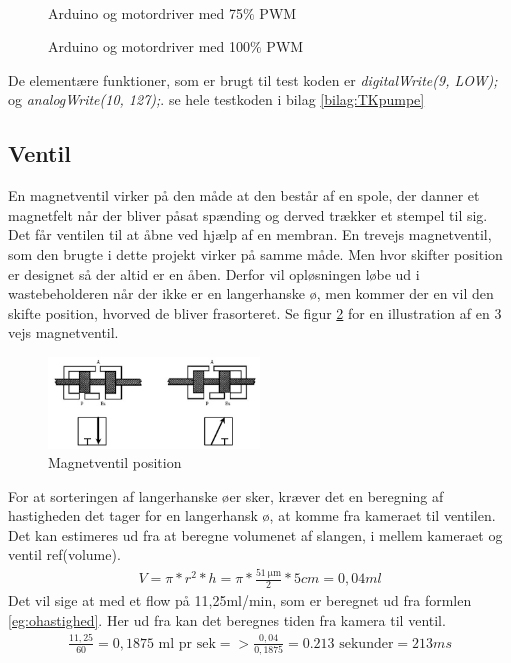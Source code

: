 \begin{figure}[htbp]
\begin{minipage}[b]{0.48\textwidth}
\end{minipage} \\ %
\begin{minipage}[t]{0.48\textwidth}
\caption{Arduino og motordriver med 75$\%$ PWM} %
\label{fig:75PWM}
\end{minipage} \hfill
\begin{minipage}[t]{0.48\textwidth}
\caption{Arduino og motordriver med 100$\%$ PWM} %
\label{fig:100PWM}
\end{minipage}
\end{figure}

De elementære funktioner, som er brugt til test koden er \textit{digitalWrite(9, LOW);} og \textit{analogWrite(10, 127);}. se hele testkoden i bilag \ref{bilag:TKpumpe}

\newpage

 \subsection{Ventil}
 En magnetventil virker på den måde at den består af en spole, der danner et magnetfelt når der bliver påsat spænding og derved trækker et stempel til sig. Det får ventilen til at åbne ved hjælp af en membran. En trevejs magnetventil, som den brugte i dette projekt virker på samme måde. Men hvor skifter position er designet så der altid er en åben. Derfor vil opløsningen løbe ud i wastebeholderen når der ikke er en langerhanske ø, men kommer der en vil den skifte position, hvorved de bliver frasorteret. Se figur \ref{fig:ventilpos} for en illustration af en 3 vejs magnetventil.

\begin{figure}[H]
	\centering
	\includegraphics[width=0.5\textwidth]{billeder/Hardware/ventil.png}
	\caption{Magnetventil position}
	\label{fig:ventilpos}
\end{figure}  
For at sorteringen af langerhanske øer sker, kræver det en beregning af hastigheden det tager for en langerhansk ø, at komme fra kameraet til ventilen. Det kan estimeres ud fra at beregne volumenet af slangen, i mellem kameraet og ventil ref(volume).
\begin{align}
V=\pi*r^2*h=\pi*\frac{\SI{51}{\micro\metre}}{2}*5cm=0,04ml
\end{align}
 Det vil sige at med et flow på 11,25ml/min, som er beregnet ud fra formlen \ref{eg:ohastighed}. Her ud fra kan det beregnes tiden fra kamera til ventil. 
 \begin{align}
\frac{11,25}{60}=0,1875\text{ ml pr sek}=>\frac{0,04}{0,1875}=0.213\text{ sekunder}=213ms
\end{align}

